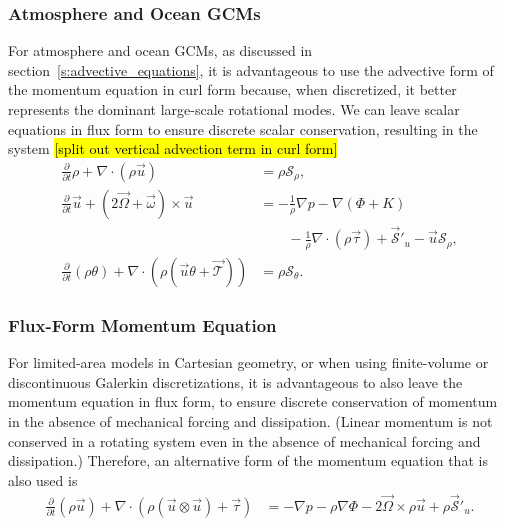 \documentclass{report}
\begin{document}
\subsubsection{Atmosphere and Ocean GCMs}

For atmosphere and ocean GCMs, as discussed in section~\ref{s:advective_equations}, it is advantageous to use the advective form of the momentum equation in curl form because, when discretized, it better represents the dominant large-scale rotational modes. We can leave scalar equations in flux form to ensure discrete scalar conservation, resulting in the system \hl{[split out vertical advection term in curl form]}
\begin{subequations}\label{e:EOM_gcm}
\begin{align}
     \frac{\partial}{\partial t} \rho + \nabla \cdot \left( \rho \vec{u} \right)
    & = \rho \mathcal{S}_\rho,  \\
    \frac{\partial}{\partial t} \vec{u} + (2\vec{\Omega} + \vec{\omega}) \times \vec{u}
    & = -\frac{1}{\rho} \nabla p - \nabla(\Phi + K) \nonumber \\
    & \qquad - \frac{1}{\rho} \nabla \cdot \left(\rho \vec{\tau} \right) + \vec{\mathcal{S}}'_u 
    - \vec{u} \mathcal{S}_\rho, \\
    \frac{\partial}{\partial t} (\rho \theta) + \nabla \cdot \left(\rho (\vec{u}\theta + \vec{\mathcal{T}}) \right)
    & = \rho \mathcal{S}_\theta.
\end{align}
\end{subequations}


\subsubsection{Flux-Form Momentum Equation}

For limited-area models in Cartesian geometry, or when using finite-volume or discontinuous Galerkin discretizations, it is advantageous to also leave the momentum equation in flux form, to ensure discrete conservation of momentum in the absence of mechanical forcing and dissipation. (Linear momentum is not conserved in a rotating system even in the absence of mechanical forcing and dissipation.) Therefore, an alternative form of the momentum equation that is also used is
\begin{align}
    \frac{\partial}{\partial t} (\rho \vec{u})
    + \nabla \cdot \left( \rho (\vec{u} \otimes \vec{u}) + \vec{\tau} \right)
    & = - \nabla p - \rho\nabla\Phi - 2\vec{\Omega} \times \rho\vec{u} + \rho\vec{\mathcal{S}}'_u.
\end{align}
\end{document}
